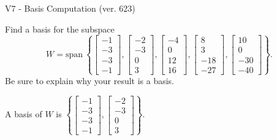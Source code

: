 \begin{exercise}
  \begin{exerciseTitle}V7 - Basis Computation (ver. 623)\end{exerciseTitle}
  \begin{exerciseStatement}
    Find a basis for the subspace 
\[W=\mathrm{span}\ \left\{\left[\begin{array}{r}
-1 \\
-3 \\
-3 \\
-1
\end{array}\right] , \left[\begin{array}{r}
-2 \\
-3 \\
0 \\
3
\end{array}\right] , \left[\begin{array}{r}
-4 \\
0 \\
12 \\
16
\end{array}\right] , \left[\begin{array}{r}
8 \\
3 \\
-18 \\
-27
\end{array}\right] , \left[\begin{array}{r}
10 \\
0 \\
-30 \\
-40
\end{array}\right]\right\}.\]
 Be sure to explain why your result is a basis.


  \end{exerciseStatement}
  \begin{exerciseAnswer}
   A basis of \(W\) is  \(\left\{\left[\begin{array}{r}
-1 \\
-3 \\
-3 \\
-1
\end{array}\right] , \left[\begin{array}{r}
-2 \\
-3 \\
0 \\
3
\end{array}\right]\right\}\).
  


  \end{exerciseAnswer}
\end{exercise}